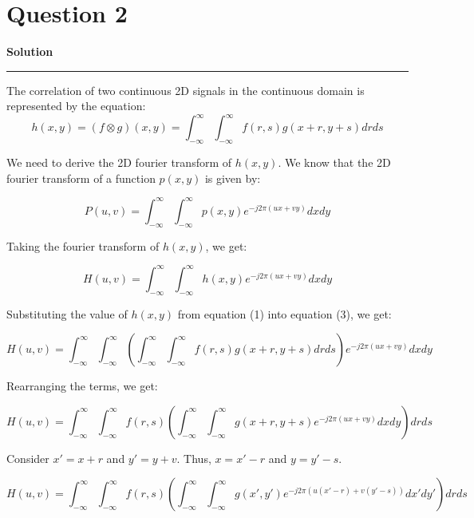\documentclass[a4paper]{article}
\title{\cooltitle{CS663 Assignment-3}}
\author{{\bf Saksham Rathi, Kavya Gupta, Shravan Srinivasa Raghavan} \\
\small Department of Computer Science, \\
Indian Institute of Technology Bombay \\}
\date{}
\newenvironment{solution}[2][]{%
    \begin{mdframed}[linecolor=green!60!black, linewidth=2pt, roundcorner=10pt, backgroundcolor=green!5!white, skipabove=12pt, skipbelow=12pt]%
        \textbf{\large #2} %
        \par\noindent\rule{\textwidth}{0.4pt} %
        \vspace{0.5em} %
}{%
    \end{mdframed}%
}
\begin{document}
\maketitle
\section*{Question 2}

\begin{solution}{Solution}
    The correlation of two continuous 2D signals in the continuous domain is represented by the equation:
\begin{equation}
    h(x, y) = (f \otimes g)(x, y) = \int_{-\infty}^{\infty} \int_{-\infty}^{\infty} f(r, s)g(x+r, y+s) dr ds
\end{equation}

We need to derive the 2D fourier transform of $h(x, y)$. We know that the 2D fourier transform of a function $p(x, y)$ is given by: 

\begin{equation}
    P(u, v) = \int_{-\infty}^{\infty} \int_{-\infty}^{\infty} p(x, y) e^{-j2\pi(ux+vy)} dx dy
\end{equation}

Taking the fourier transform of $h(x, y)$, we get:

\begin{equation}
    H(u, v) = \int_{-\infty}^{\infty} \int_{-\infty}^{\infty} h(x, y) e^{-j2\pi(ux+vy)} dx dy
\end{equation}

Substituting the value of $h(x, y)$ from equation (1) into equation (3), we get:

\begin{equation}
    H(u, v) = \int_{-\infty}^{\infty} \int_{-\infty}^{\infty} \left( \int_{-\infty}^{\infty} \int_{-\infty}^{\infty} f(r, s)g(x+r, y+s) dr ds \right) e^{-j2\pi(ux+vy)} dx dy
\end{equation}

Rearranging the terms, we get:

\begin{equation}
    H(u, v) = \int_{-\infty}^{\infty} \int_{-\infty}^{\infty} f(r, s) \left( \int_{-\infty}^{\infty} \int_{-\infty}^{\infty} g(x+r, y+s) e^{-j2\pi(ux+vy)} dx dy \right) dr ds
\end{equation}


Consider $x' = x + r$ and $y' = y + v$. Thus, $x = x' - r$ and $y = y' - s$.

\begin{equation}
    H(u, v) = \int_{-\infty}^{\infty} \int_{-\infty}^{\infty} f(r, s) \left( \int_{-\infty}^{\infty} \int_{-\infty}^{\infty} g(x', y') e^{-j2\pi(u(x'-r)+v(y'-s))} dx' dy' \right) dr ds
\end{equation}


\end{solution}
\end{document}
